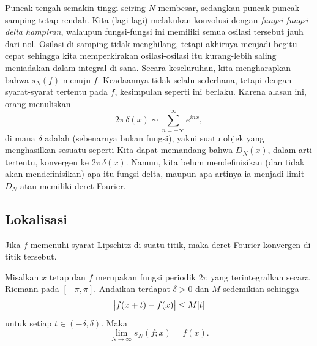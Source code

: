 \begin{myfigureht}
\caption{Grafik $D_N(x)$ untuk $N=5$ (abu-abu) dan $N=20$
(hitam).\label{fig:approxdeltas}}
\end{myfigureht}

Puncak tengah semakin tinggi seiring $N$ membesar,
sedangkan puncak-puncak samping tetap rendah.
Kita (lagi-lagi) melakukan konvolusi dengan
\emph{fungsi-fungsi delta hampiran},
walaupun fungsi-fungsi ini memiliki
semua osilasi tersebut jauh dari nol. Osilasi di samping tidak menghilang,
tetapi akhirnya menjadi begitu cepat sehingga kita memperkirakan
osilasi-osilasi itu kurang-lebih saling meniadakan dalam integral di sana.
Secara keseluruhan, kita mengharapkan bahwa
$s_N(f)$ menuju $f$. Keadaannya tidak selalu sederhana,
tetapi dengan syarat-syarat tertentu pada $f$, kesimpulan seperti ini berlaku. Karena alasan ini,
orang menuliskan
\begin{equation*}
2\pi \, \delta(x) \sim \sum_{n=-\infty}^\infty e^{inx} ,
\end{equation*}
di mana $\delta$ adalah  (sebenarnya bukan fungsi),
yakni suatu objek yang menghasilkan sesuatu seperti
Kita dapat memandang bahwa $D_N(x)$, dalam arti tertentu, konvergen ke $2 \pi\, \delta(x)$.
Namun, kita belum mendefinisikan (dan tidak akan mendefinisikan) apa itu fungsi delta,
maupun apa artinya ia menjadi limit $D_N$ atau memiliki deret Fourier.

\subsection{Lokalisasi}

Jika $f$ memenuhi syarat Lipschitz di suatu titik, maka
deret Fourier konvergen di titik tersebut.

\begin{thm} \label{thm:fourierlocalization}
Misalkan $x$ tetap dan $f$ merupakan fungsi periodik $2\pi$
yang terintegralkan secara Riemann pada $[-\pi,\pi]$.  Andaikan
terdapat $\delta > 0$ dan $M$ sedemikian sehingga
\begin{equation*}
\bigl\lvert {f(x+t)-f(x)} \bigr\rvert \leq M \lvert {t} \rvert
\end{equation*}
untuk setiap $t \in (-\delta,\delta)$. Maka
\begin{equation*}
\lim_{N \to \infty} s_N(f;x) = f(x) .
\end{equation*}
\end{thm}

